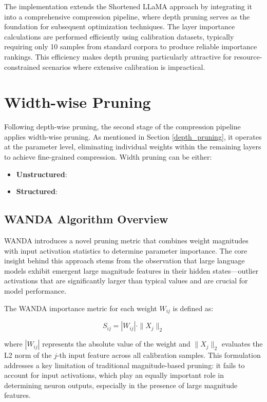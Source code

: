 The implementation extends the Shortened LLaMA approach by integrating it into a comprehensive compression pipeline, where depth pruning serves as the foundation for subsequent optimization techniques. The layer importance calculations are performed efficiently using calibration datasets, typically requiring only 10 samples from standard corpora to produce reliable importance rankings. This efficiency makes depth pruning particularly attractive for resource-constrained scenarios where extensive calibration is impractical.

\section{Width-wise Pruning} \label{wanda}

Following depth-wise pruning, the second stage of the compression pipeline applies width-wise pruning. As mentioned in Section \ref{depth_pruning}, it operates at the parameter level, eliminating individual weights within the remaining layers to achieve fine-grained compression. Width pruning can be either:
\begin{itemize}
    \item \textbf{Unstructured}:
    \item \textbf{Structured}:
\end{itemize}

\subsection{WANDA Algorithm Overview}

WANDA introduces a novel pruning metric that combines weight magnitudes with input activation statistics to determine parameter importance. The core insight behind this approach stems from the observation that large language models exhibit emergent large magnitude features in their hidden states—outlier activations that are significantly larger than typical values and are crucial for model performance.

The WANDA importance metric for each weight $W_{ij}$ is defined as:

\begin{equation}
S_{ij} = |W_{ij}| \cdot \|X_j\|_2
\end{equation}

where $|W_{ij}|$ represents the absolute value of the weight and $\|X_j\|_2$ evaluates the L2 norm of the $j$-th input feature across all calibration samples. This formulation addresses a key limitation of traditional magnitude-based pruning: it fails to account for input activations, which play an equally important role in determining neuron outputs, especially in the presence of large magnitude features.

